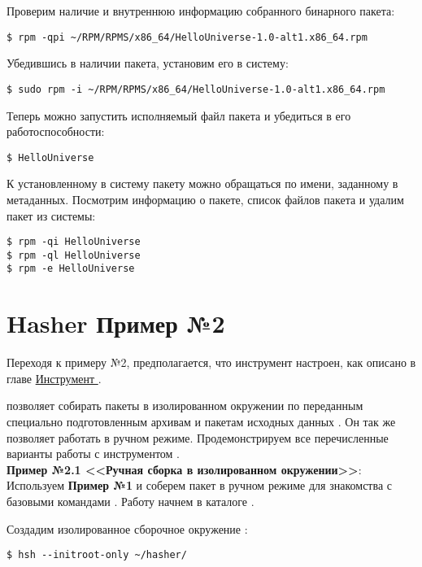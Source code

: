 Проверим наличие и внутреннюю информацию собранного бинарного пакета:
\begin{verbatim}
$ rpm -qpi ~/RPM/RPMS/x86_64/HelloUniverse-1.0-alt1.x86_64.rpm
\end{verbatim}

Убедившись в наличии пакета, установим его в систему:
\begin{verbatim}
$ sudo rpm -i ~/RPM/RPMS/x86_64/HelloUniverse-1.0-alt1.x86_64.rpm
\end{verbatim}

Теперь можно запустить исполняемый файл пакета и убедиться в его
работоспособности:
\begin{verbatim}
$ HelloUniverse
\end{verbatim}

К установленному в систему пакету можно обращаться по имени, заданному в
метаданных. Посмотрим информацию о пакете, список файлов пакета и удалим
пакет из системы:
\begin{verbatim}
$ rpm -qi HelloUniverse
$ rpm -ql HelloUniverse
$ rpm -e HelloUniverse
\end{verbatim}

\section{Hasher \textbf{Пример №2}}

Переходя к примеру №2, предполагается, что инструмент  настроен,
как описано в главе \hyperlink{5}{Инструмент }.

 позволяет собирать пакеты в изолированном окружении по
переданным специально подготовленным архивам  и пакетам
исходных данных . Он так же позволяет работать в ручном
режиме. Продемонстрируем все перечисленные варианты работы с
инструментом .\\

\textbf{Пример №2.1 <<Ручная сборка в изолированном окружении>>}:\\

Используем \textbf{Пример №1} и соберем пакет  в ручном режиме
для знакомства с базовыми командами . Работу начнем в
каталоге .

Создадим изолированное сборочное окружение :

\begin{verbatim}
$ hsh --initroot-only ~/hasher/
\end{verbatim}

